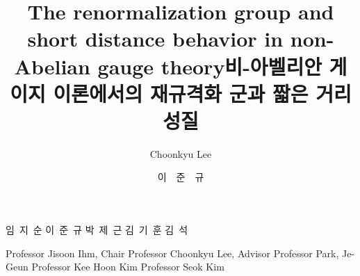 \title{The renormalization group and short distance behavior in non-Abelian gauge theory} %
\title*{비-아벨리안 게이지 이론에서의 재규격화 군과 짧은 거리 성질} %


\author{Choonkyu Lee} %
\author*{이~~준~~규} %





\committeemembers%
{임~지~순}%
{이~준~규}%
{박~제~근}%
{김~기~훈}%
{김~석}%

\encommitteemembers%
{Professor Jisoon Ihm, Chair}%
{Professor Choonkyu Lee, Advisor}%
{Professor Park, Je-Geun}%
{Professor Kee Hoon Kim}%
{Professor Seok Kim}%